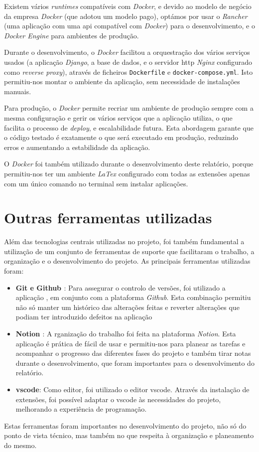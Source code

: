 Existem vários \textit{runtimes} compatíveis com \textit{Docker}, e devido ao modelo de negócio da empresa \textit{Docker} (que adotou um modelo pago), optámos por usar o \textit{Rancher} (uma aplicação com uma \gls{api} compatível com \textit{Docker}) para o desenvolvimento, e o \textit{Docker Engine} para ambientes de produção.

Durante o desenvolvimento, o \textit{Docker} facilitou a orquestração dos vários serviços usados (a aplicação \textit{Django}, a base de dados, e o servidor \gls{http} \textit{Nginx} configurado como \textit{reverse proxy}), através de ficheiros \texttt{Dockerfile} e \texttt{docker-compose.yml}. Isto permitiu-nos montar o ambiente da aplicação, sem necessidade de instalações manuais.

Para produção, o \textit{Docker} permite recriar um ambiente de produção sempre com a mesma configuração e gerir os vários serviços que a aplicação utiliza, o que facilita o processo de \textit{deploy}, e escalabilidade futura. Esta abordagem garante que o código testado é exatamente o que será executado em produção, reduzindo erros e aumentando a estabilidade da aplicação.

O \textit{Docker} foi também utilizado durante o desenvolvimento deste relatório, porque permitiu-nos ter um ambiente \textit{LaTex} configurado com todas as extensões apenas com um único comando no terminal sem instalar aplicações.

\section{Outras ferramentas utilizadas}
\label{sec:tools}

Além das tecnologias centrais utilizadas no projeto, foi também fundamental a utilização de um conjunto de ferramentas de suporte que facilitaram o trabalho, a organização e o desenvolvimento do projeto. As principais ferramentas utilizadas foram:

\begin{itemize}
    \item \textbf{Git \cite{git} e Github \cite{github}}: Para assegurar o controlo de versões, foi utilizado a aplicação , em conjunto com a plataforma \textit{Github}. Esta combinação permitiu não só manter um histórico das alterações feitas e reverter alterações que podiam ter introduzido defeitos na aplicação

    \item \textbf{Notion \cite{notion}}: A rganização do trabalho foi feita na plataforma \textit{Notion}. Esta aplicação é prática de fácil de usar e permitiu-nos para planear as tarefas e acompanhar o progresso das diferentes fases do projeto e também tirar notas durante o desenvolvimento, que foram importantes para o desenvolvimento do relatório.

    \item \textbf{\gls{vscode}\cite{vscode}}: Como editor, foi utilizado o editor \gls{vscode}. Através da instalação de extensões, foi possível adaptar o \gls{vscode} às necessidades do projeto, melhorando a experiência de programação.
\end{itemize}

Estas ferramentas foram importantes no desenvolvimento do projeto, não só do ponto de vista técnico, mas também no que respeita à organização e planeamento do mesmo.
